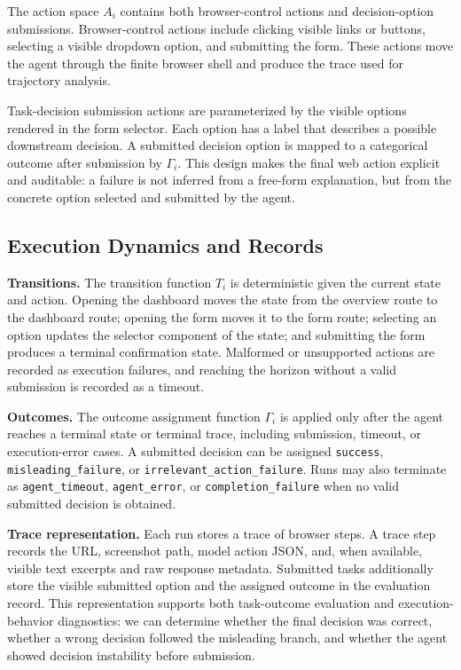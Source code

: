 \documentclass[11pt]{article}
\begin{document}
The action space $A_i$ contains both browser-control actions and decision-option submissions. Browser-control actions include clicking visible links or buttons, selecting a visible dropdown option, and submitting the form. These actions move the agent through the finite browser shell and produce the trace used for trajectory analysis.

Task-decision submission actions are parameterized by the visible options rendered in the form selector. Each option has a label that describes a possible downstream decision. A submitted decision option is mapped to a categorical outcome after submission by $\Gamma_i$. This design makes the final web action explicit and auditable: a failure is not inferred from a free-form explanation, but from the concrete option selected and submitted by the agent.

\subsection{Execution Dynamics and Records}

\textbf{Transitions.} The transition function $T_i$ is deterministic given the current state and action. Opening the dashboard moves the state from the overview route to the dashboard route; opening the form moves it to the form route; selecting an option updates the selector component of the state; and submitting the form produces a terminal confirmation state. Malformed or unsupported actions are recorded as execution failures, and reaching the horizon without a valid submission is recorded as a timeout.

\textbf{Outcomes.} The outcome assignment function $\Gamma_i$ is applied only after the agent reaches a terminal state or terminal trace, including submission, timeout, or execution-error cases. A submitted decision can be assigned \texttt{success}, \texttt{misleading\_failure}, or \texttt{irrelevant\_action\_failure}. Runs may also terminate as \texttt{agent\_timeout}, \texttt{agent\_error}, or \texttt{completion\_failure} when no valid submitted decision is obtained.

\textbf{Trace representation.} Each run stores a trace of browser steps. A trace step records the URL, screenshot path, model action JSON, and, when available, visible text excerpts and raw response metadata. Submitted tasks additionally store the visible submitted option and the assigned outcome in the evaluation record. This representation supports both task-outcome evaluation and execution-behavior diagnostics: we can determine whether the final decision was correct, whether a wrong decision followed the misleading branch, and whether the agent showed decision instability before submission.
\end{document}
